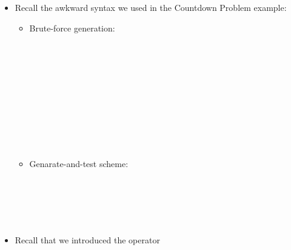\documentclass{beamer}
\begin{document}
\begin{itemize}
  \item Recall the awkward syntax we used in the Countdown Problem example:
  \begin{itemize}
    \item Brute-force generation:
    
    {\small{{}{}{\hlopt{=}}{\hlendline{}}\\
    {\hlstd{ \ }}{}{}{}{\hlopt{(}}{}{}{\hlopt{->}}{}{\hlopt{(}}{}{\hlopt{,}}{}{\hlopt{,}}{}{\hlopt{))
    [}}{}{\hlopt{; }}{}{\hlopt{;
    }}{}{\hlopt{; }}{}{\hlopt{]}}{\hlendline{}}\\
    {}{}{\hlopt{=
    }}{}{\hlendline{}}\\
    {\hlstd{ \ }}{\hlopt{\textbar  [] -> []}}{\hlendline{}}\\
    {\hlstd{ \ }}{\hlopt{\textbar  [}}{}{\hlopt{] -> [}}{}{}{\hlopt{]}}{\hlendline{}}\\
    {}{\hlopt{->}}{\hlendline{}}\\
    {}{\hlopt{-> (}}{}{\hlopt{(}}{}{\hlopt{,}}{}{\hlopt{)
    ->}}{\hlendline{}}\\
    {}{\hlopt{-> (}}{}{}{\hlopt{->}}{\hlendline{}}\\
    {}{\hlopt{->
    (}}{}{}{\hlopt{->}}{\hlendline{}}\\
    {}{\hlopt{)))}}{\hlendline{}}}}
    
    \item Genarate-and-test scheme:
    
    {\small{{}{}{\hlopt{=}}{}{}{}{\hlopt{[}}{}{\hlopt{]
    }}{}{\hlopt{[]}}{\hlendline{}}\\
    {}{}{\hlopt{=}}{\hlendline{}}\\
    {}{\hlopt{-> (}}{}{}{\hlopt{->}}{\hlendline{}}\\
    {}{\hlopt{->}}{\hlendline{}}\\
    {}{\hlopt{(}}{}{}{\hlopt{->
    }}{}{\hlopt{= }}{}{}{\hlopt{))}}}}{\hlendline{}}
  \end{itemize}
  \item Recall that we introduced the operator
  

\end{itemize}
\end{document}
